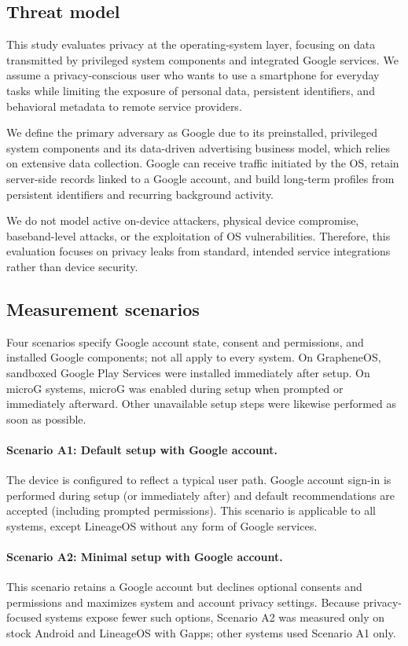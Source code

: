 \documentclass[runningheads]{llncs}
\begin{document}
\subsection{Threat model}

This study evaluates privacy at the operating-system layer, focusing on data transmitted by privileged system components and integrated Google services. We assume a privacy-conscious user who wants to use a smartphone for everyday tasks while limiting the exposure of personal data, persistent identifiers, and behavioral metadata to remote service providers.

We define the primary adversary as Google due to its preinstalled, privileged system components and its data-driven advertising business model, which relies on extensive data collection. Google can receive traffic initiated by the OS, retain server-side records linked to a Google account, and build long-term profiles from persistent identifiers and recurring background activity.

We do not model active on-device attackers, physical device compromise, baseband-level attacks, or the exploitation of OS vulnerabilities. Therefore, this evaluation focuses on privacy leaks from standard, intended service integrations rather than device security.

\subsection{Measurement scenarios}
Four scenarios specify Google account state, consent and permissions, and installed Google components; not all apply to every system. On GrapheneOS, sandboxed Google Play Services were installed immediately after setup. On microG systems, microG was enabled during setup when prompted or immediately afterward. Other unavailable setup steps were likewise performed as soon as possible.

\paragraph{Scenario A1: Default setup with Google account.}
The device is configured to reflect a typical user path. Google account sign-in is performed during setup (or immediately after) and default recommendations are accepted (including prompted permissions). This scenario is applicable to all systems, except LineageOS without any form of Google services.

\paragraph{Scenario A2: Minimal setup with Google account.}
This scenario retains a Google account but declines optional consents and permissions and maximizes system and account privacy settings. Because privacy-focused systems expose fewer such options, Scenario A2 was measured only on stock Android and LineageOS with Gapps; other systems used Scenario A1 only.
\end{document}
